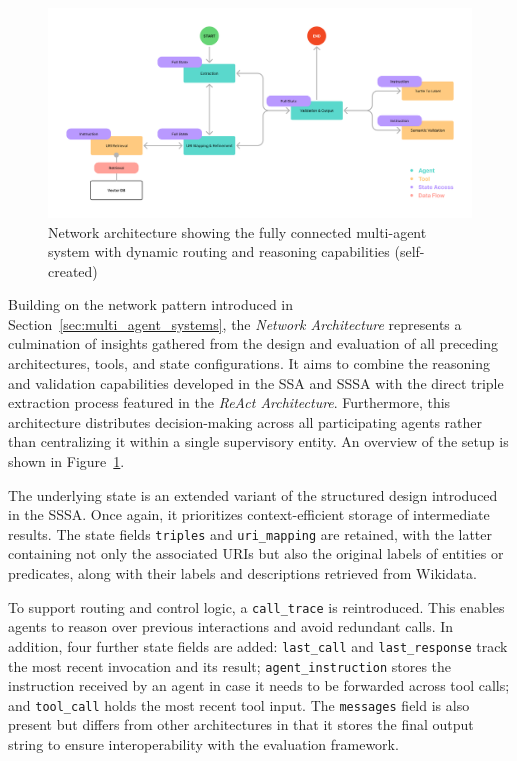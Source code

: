 \documentclass[a4paper,oneside,bibliography=totoc]{scrbook}
\begin{document}
\begin{figure}[h]
  \centering
  \includegraphics[width=\textwidth]{figures/Network Architecture.png}
  \caption[Network architecture showing the fully connected multi-agent system with dynamic routing and reasoning capabilities]{Network architecture showing the fully connected multi-agent system with dynamic routing and reasoning capabilities (self-created)}
  \label{fig:network_architecture}
\end{figure}

Building on the network pattern introduced in Section~\ref{sec:multi_agent_systems}, the \textit{Network Architecture} represents a culmination of insights gathered from the design and evaluation of all preceding architectures, tools, and state configurations. It aims to combine the reasoning and validation capabilities developed in the \ac{SSA} and \ac{SSSA} with the direct triple extraction process featured in the \textit{ReAct Architecture}. Furthermore, this architecture distributes decision-making across all participating agents rather than centralizing it within a single supervisory entity. An overview of the setup is shown in Figure~\ref{fig:network_architecture}.

The underlying state is an extended variant of the structured design introduced in the \ac{SSSA}. Once again, it prioritizes context-efficient storage of intermediate results. The state fields \texttt{triples} and \texttt{uri\_mapping} are retained, with the latter containing not only the associated URIs but also the original labels of entities or predicates, along with their labels and descriptions retrieved from Wikidata.

To support routing and control logic, a \texttt{call\_trace} is reintroduced. This enables agents to reason over previous interactions and avoid redundant calls. In addition, four further state fields are added: \texttt{last\_call} and \texttt{last\_response} track the most recent invocation and its result; \texttt{agent\_instruction} stores the instruction received by an agent in case it needs to be forwarded across tool calls; and \texttt{tool\_call} holds the most recent tool input. The \texttt{messages} field is also present but differs from other architectures in that it stores the final output string to ensure interoperability with the evaluation framework.
\end{document}
